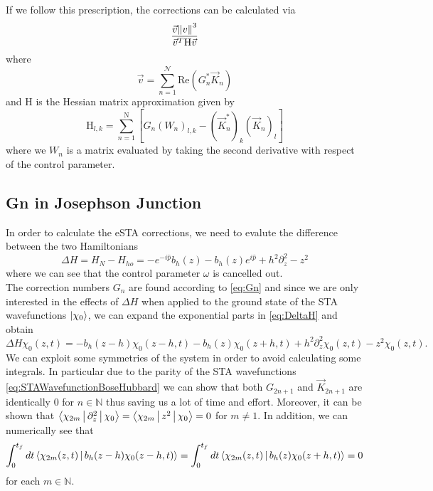 \documentclass{article}
\begin{document}
If we follow this prescription, the corrections can be calculated via
\begin{equation}
	\frac
	{\vec{v}\norm{v}^{3}}
	{\vec{v}^{T}\mathrm{H}\vec{v}}
	\label{eq:eSTAcorrectionsHessian}
\end{equation}
where
\begin{equation}
	\vec{v} = \sum_{n=1}^{\mathcal{N}}\text{Re}(G_{n}^{*}\vec{K}_{n})
	\label{eq:FidelityVector}
\end{equation}
and $ \mathrm{H} $ is the Hessian matrix approximation given by
\begin{equation}
	\mathrm{H}_{l,k} = \sum_{n = 1}^{\mathrm{N}}\left[G_{n}(W_{n})_{l,k} - \left(  \vec{K}^{*}_{n} \right)_{k}\left(  \vec{K}_{n} \right)_{l}\right]
	\label{eq:HessianMatrix}
\end{equation}
where we $ W_{n} $ is a matrix evaluated by taking the second derivative with respect of the control parameter.
\subsection{Gn in Josephson Junction}
In order to calculate the eSTA corrections, we need to evalute the difference between the two Hamiltonians
\begin{equation}
	\label{eq:DeltaH}
	\Delta H = H_{N} - H_{ho} =
	- e^{-i\hat{p}} b_{h}(z) - b_{h}(z)e^{i\hat{p}} + h^2 \partial_z^2 - z^2
\end{equation}
where we can see that the control parameter $ \omega $ is cancelled out.\\
The correction numbers $ G_{n} $ are found according to \cref{eq:Gn} and since we are only interested in the effects of $ \Delta H  $ when applied to the ground state of the STA wavefunctions $ \ket{\chi_{0}} $, we can expand the exponential parts in \cref{eq:DeltaH} and obtain
\begin{equation}
	\label{eq:DeltaHOnGroundState}
	\Delta H \chi_{0}(z,t) = - b_{h}(z-h)\chi_{0}(z-h,t) - b_{h}(z)\chi_{0}(z+h,t) + h^2\partial^2_{z}\chi_{0}(z,t) - z^2\chi_{0}(z,t).
\end{equation}
We can exploit some symmetries of the system in order to avoid calculating some integrals.
In particular due to the parity of the STA wavefunctions \cref{eq:STAWavefunctionBoseHubbard} we can show that both $ G_{2n+1} $ and $ \vec{K}_{2n +1} $ are identically 0 for $ n \in \mathbb{N} $ thus saving us a lot of time and effort.
Moreover, it can be shown that $ \Braket{\chi_{2m}|\partial_z^{2}|\chi_{0} } = \Braket{\chi_{2m}|z^{2}|\chi_{0} } = 0 $ for $ m \neq 1 $.
In addition, we can numerically see that
\begin{equation}
	\int_{0}^{t_{f}} dt
	\Braket{
	\chi_{2m}(z,t)|b_{h}(z-h)\chi_{0}(z-h,t)} =
	\int_{0}^{t_{f}} dt
	\Braket{\chi_{2m}(z,t)|b_{h}(z)\chi_{0}(z+h,t)} = 0
\end{equation}
for each $ m \in \mathbb{N} $.
\end{document}

